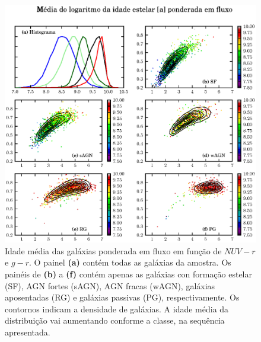 \begin{figure}
	\includegraphics{figuras/uvcolor-color-at_flux-byclass.eps}
	\caption[Idade média das galáxias ponderada em fluxo no diagrama cor--cor UV.]
	{Idade média das galáxias ponderada em fluxo em função de $NUV-r$ e $g-r$. O
	painel \textbf{(a)} contém todas as galáxias da amostra. Os painéis de
	\textbf{(b)} a \textbf{(f)} contém apenas as galáxias con formação estelar
	(SF), AGN fortes (sAGN), AGN fracas (wAGN), galáxias aposentadas (RG) e
	galáxias passivas (PG), respectivamente. Os contornos indicam a densidade de
	galáxias. A idade média da distribuição vai aumentando conforme a classe, na
	sequência apresentada.}
	\label{fig:ATFluxColor}
\end{figure}

